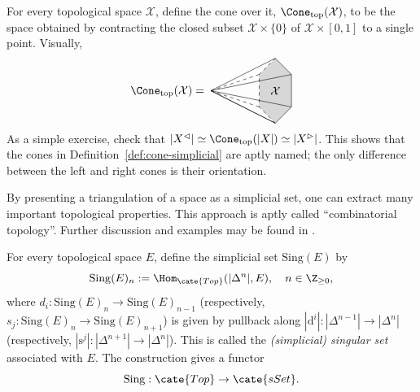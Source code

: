 \begin{example}\label{eg:cone-realization}
	For every topological space $\mathcal{X}$, define the cone over it,
	$\Cone_{\mathrm{top}}(\mathcal{X})$, to be the space obtained by
	contracting the closed subset $\mathcal{X}\times\{0\}$ of
	$\mathcal{X}\times[0,1]$ to a single point. Visually,
	\[\Cone_{\mathrm{top}}(\mathcal{X}) = \; \begin{tikzpicture}[baseline=(P)]
		\coordinate (A) at (0, 1);
		\coordinate (B) at (0.5, 0.5);
		\coordinate (C) at (0.5, -0.5);
		\coordinate (D) at (0, -1);
		\coordinate (E) at (-0.5, -0.5);
		\coordinate (F) at (-0.5, 0.5);
		\coordinate (O) at (-2, 0);
		\coordinate (P) at (0, -0.1);	%

		\fill[gray!50, opacity=0.6] (A) -- (B) -- (C) -- (D) -- (E) -- (F) --cycle;
		\draw (O) -- (A) -- (B) -- (C) -- (D) --cycle;
		\draw (O) -- (B);
		\draw (O) -- (C);
		\draw (O) -- (D);
		\draw[dashed] (D) -- (E) -- (F) -- (A);
		\draw[dashed] (O) -- (E);
		\draw[dashed] (O) -- (F);
		\node at (0, 0) {$\mathcal{X}$};
	\end{tikzpicture}\]
	As a simple exercise, check that
	$|X^{\lhd}|\simeq\Cone_{\mathrm{top}}(|X|)\simeq|X^{\rhd}|$. This shows
	that the cones in Definition~\ref{def:cone-simplicial} are aptly named;
	the only difference between the left and right cones is their orientation.
\end{example}

By presenting a triangulation of a space as a simplicial set, one can extract
many important topological properties. This approach is aptly called
``combinatorial topology''. Further discussion and examples may be found in
\cite[Chapter VI]{You}.

\begin{definition}
	For every topological space $E$, define the simplicial set
	$\mathrm{Sing}(E)$ by
	\[ \mathrm{Sing}(E)_n := \Hom_{\cate{Top}}(|\Delta^n|, E), \quad n \in \Z_{\geq 0}, \]
	where $d_i:\mathrm{Sing}(E)_n\to\mathrm{Sing}(E)_{n-1}$
	(respectively, $s_j:\mathrm{Sing}(E)_n\to\mathrm{Sing}(E)_{n+1}$) is
	given by pullback along
	$|\mathrm{d}^i|:|\Delta^{n-1}|\to|\Delta^n|$ (respectively,
	$|\mathrm{s}^j|:|\Delta^{n+1}|\to|\Delta^n|$). This is called the
	\emph{(simplicial) singular set} associated with $E$. The construction
	gives a functor
	\[ \mathrm{Sing}: \cate{Top} \to \cate{sSet}. \]
\end{definition}

